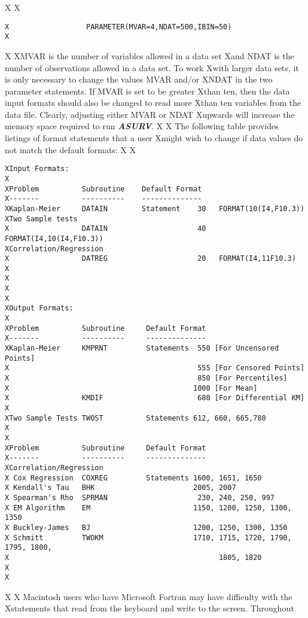 X
X\begin{verbatim}
X                  PARAMETER(MVAR=4,NDAT=500,IBIN=50)
X\end{verbatim}  
X
XMVAR is the number of variables allowed in a data set 
Xand NDAT is the number of observations allowed in a data set.  To work 
Xwith larger data sets, it is only necessary to change the values MVAR and/or 
XNDAT in the two parameter statements.  If MVAR is set to be greater 
Xthan ten, then the data input formats should also be changed to read more 
Xthan ten variables from the data file.  Clearly, adjusting either MVAR or NDAT
Xupwards will increase the memory space required to run {\sl\bf ASURV}.
X
X       The following table provides listings of format statements that a user 
Xmight wish to change if data values do not match the default formats:  
X
X\begin{verbatim}
XInput Formats:
X
XProblem          Subroutine    Default Format      
X-------          ----------    --------------
XKaplan-Meier     DATAIN        Statement    30   FORMAT(10(I4,F10.3))
XTwo Sample tests 
X                 DATAIN                     40   FORMAT(I4,10(I4,F10.3))
XCorrelation/Regression
X                 DATREG                     20   FORMAT(I4,11F10.3)
X
X
X
X
XOutput Formats:
X
XProblem          Subroutine     Default Format
X-------          ----------     --------------
XKaplan-Meier     KMPRNT         Statements  550 [For Uncensored Points] 
X                                            555 [For Censored Points]  
X                                            850 [For Percentiles]
X                                           1000 [For Mean]
X                 KMDIF                      680 [For Differential KM]
X
XTwo Sample Tests TWOST          Statements 612, 660, 665,780
X        
X
XProblem          Subroutine     Default Format
X-------          ----------     --------------
XCorrelation/Regression
X Cox Regression  COXREG         Statements 1600, 1651, 1650
X Kendall's Tau   BHK                       2005, 2007
X Spearman's Rho  SPRMAN                     230, 240, 250, 997
X EM Algorithm    EM                        1150, 1200, 1250, 1300, 1350
X Buckley-James   BJ                        1200, 1250, 1300, 1350
X Schmitt         TWOKM                     1710, 1715, 1720, 1790, 1795, 1800,
X                                                 1805, 1820
X 
X\end{verbatim}                             
X
X     Macintosh users who have Microsoft Fortran may have difficulty with the
Xstatements that read from the keyboard and write to the screen.  Throughout
